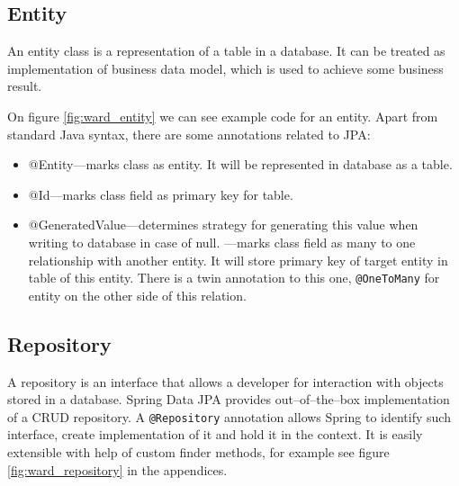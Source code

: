 \documentclass[a4paper,twoside,12pt]{book}
\begin{document}
    \subsection{Entity}
      An entity class is a representation of a table in a database.
      It can be treated as implementation of business data model, which is used to achieve some business result.

      On figure \ref{fig:ward_entity} we can see example code for an entity.
      Apart from standard Java syntax, there are some annotations related to JPA:
      \begin{itemize}
        \item @Entity---marks class as entity. It will be represented in database as a table.
        \item @Id---marks class field as primary key for table.
        \item @GeneratedValue---determines strategy for generating this value when writing to database in case of null.
        \item@ManyToOne---marks class field as many to one relationship with another entity. 
        It will store primary key of target entity in table of this entity.
        There is a twin annotation to this one, \lstinline|@OneToMany| for entity on the other side of this relation.
      \end{itemize}
    
    \subsection{Repository}
      A repository is an interface that allows a developer for interaction with objects stored in a database.
      Spring Data JPA provides out--of--the--box implementation of a CRUD repository.
      A \lstinline|@Repository| annotation allows Spring to identify such interface, create implementation of it and hold it in the context.
      It is easily extensible with help of custom finder methods, for example see figure \ref{fig:ward_repository} in the appendices.
\end{document}
